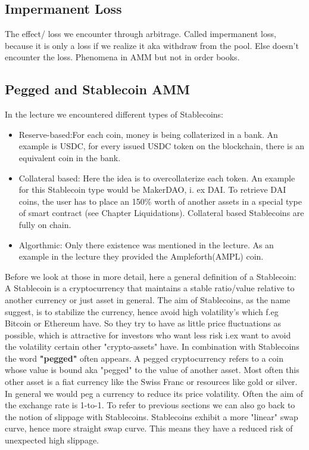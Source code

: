 \documentclass{article}
\begin{document}
\subsection{Impermanent Loss} %
The effect/ loss we encounter through arbitrage. Called impermanent loss, because it is only a loss if we realize it aka withdraw from the pool. Else doesn't encounter the loss. Phenomena in AMM but not in order books.


\subsection{Pegged and Stablecoin AMM} 
In the lecture we encountered different types of Stablecoins: 
\begin{itemize}%
    \item {Reserve-based}:For each coin, money is being collaterized in a bank. An example is USDC, for every issued USDC token on the blockchain, there is an equivalent coin in the bank. 
    \item {Collateral based}: Here the idea is to overcollaterize each token. An example for this Stablecoin type would be MakerDAO, i. ex DAI. To retrieve DAI coins, the user has to place an 150\% worth of another assets in a special type of smart contract (see Chapter Liquidations). Collateral based Stablecoins are fully on chain.
    \item {Algorthmic}: Only there existence was mentioned in the lecture. As an example in the lecture they provided the Ampleforth(AMPL) coin.
\end{itemize}Before we look at those in more detail, here a general definition of a Stablecoin: A Stablecoin is a cryptocurrency that maintains a stable ratio/value relative to another currency or just asset in general. The aim of Stablecoins, as the name suggest, is to stabilize the currency, hence avoid high volatility's which f.eg Bitcoin or Ethereum have. So they try to have as little price fluctuations as possible, which is attractive for investors who want less risk i.ex want to avoid the volatility certain other "crypto-assets" have.
In combination with Stablecoins the word  \textbf{"pegged" }often appears. A pegged cryptocurrency refers to a coin whose value is bound aka "pegged" to the value of another asset. Most often this other asset is a fiat currency like the Swiss Franc or resources like gold or silver. In general we would peg a currency to reduce its price volatility. Often the aim of the exchange rate is 1-to-1. To refer to previous sections we can also go back to the notion of slippage with Stablecoins. Stablecoins exhibit a more "linear" swap curve, hence more straight swap curve. This means they have a reduced risk of unexpected high slippage.\\
\end{document}
